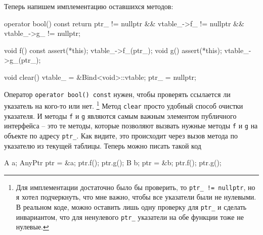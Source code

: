 Теперь напишем имплементацию оставшихся методов:
\begin{cppcode}
  operator bool() const {
    return ptr_ != nullptr && vtable_->f_ != nullptr && vtable_->g_ != nullptr;
  }

  void f() const {
    assert(*this);
    vtable_->f_(ptr_);
  }
  void g() {
    assert(*this);
    vtable_->g_(ptr_);
  }

  void clear() {
    vtable_ = &Bind<void>::vtable;
    ptr_ = nullptr;
  }
\end{cppcode}
Оператор \texttt{operator bool() const} нужен, чтобы проверять ссылается ли указатель на кого-то или нет.%
\footnote{Для имплементации достаточно было бы проверить, то \texttt{ptr\_ != nullptr}, но я хотел подчеркнуть, что мне важно, чтобы все указатели были не нулевыми.
В реальном коде, можно оставить лишь одну проверку для \texttt{ptr\_} и сделать инвариантом, что для ненулевого \texttt{ptr\_} указатели на обе функции тоже не нулевые.}
Метод \texttt{clear} просто удобный способ очистки указателя.
И методы \texttt{f} и \texttt{g} являются самым важным элементом публичного интерфейса -- это те методы, которые позволяют вызвать нужные методы \texttt{f} и \texttt{g} на объекте по адресу \texttt{ptr\_}.
Как видите, это происходит через вызов метода по указателю из текущей таблицы.
Теперь можно писать такой код
\begin{cppcode}
A a;
AnyPtr ptr = &a;
ptr.f();
ptr.g();
B b;
ptr = &b;
ptr.f();
ptr.g();
\end{cppcode}

